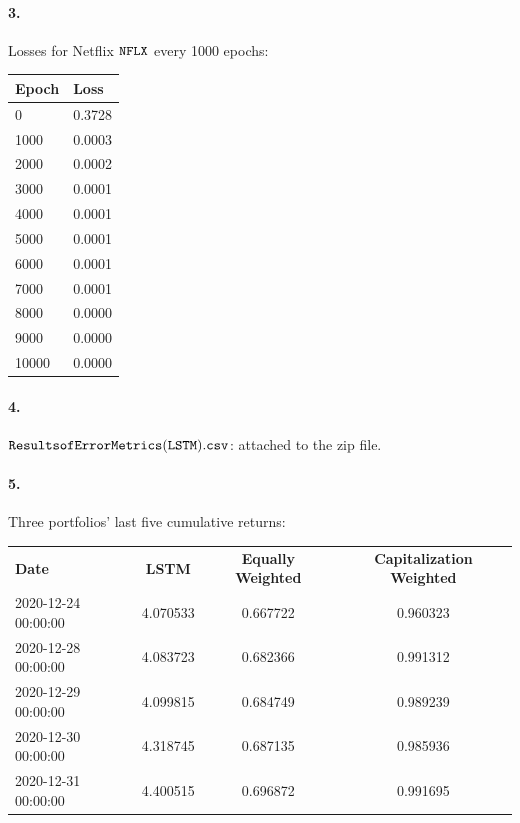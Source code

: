 \documentclass[12pt]{article}
\begin{document}
\paragraph{3.} Losses for Netflix $\tt NFLX$ every 1000 epochs:

\begin{center}
    \begin{tabular}{l l}
    \rowcolor{gray!50}
        \bf{Epoch} & \bf{Loss} \\
        \hline
    0 & 0.3728 \\
    1000 &0.0003 \\
    2000 &0.0002 \\
    3000 &0.0001 \\
    4000 &0.0001 \\
    5000 &0.0001 \\
    6000 &0.0001 \\
    7000 &0.0001 \\
    8000 &0.0000 \\
    9000 &0.0000 \\
    10000 &0.0000 \\
    \end{tabular}
\end{center}

\paragraph{4.} $ \tt Results of Error Metrics (LSTM).csv$: attached to the zip file.

\paragraph{5.} Three portfolios’ last five cumulative returns:

\begin{center}
    \begin{tabular}{l c c c}
    \rowcolor{gray!70}
    \multicolumn{4}{c}{\textbf{Cumulative Returns of Portfolios}}\\
    \hline
    \rowcolor{gray!50}
        \bf{Date} & \bf{LSTM} & \bf{Equally Weighted}& \bf{Capitalization Weighted}\\
        \hline
        2020-12-24 00:00:00	&4.070533 &0.667722 &0.960323\\
        2020-12-28 00:00:00	&4.083723 &0.682366 &0.991312\\
        2020-12-29 00:00:00	&4.099815 &0.684749 &0.989239\\
        2020-12-30 00:00:00	&4.318745 &0.687135 &0.985936\\
        2020-12-31 00:00:00	&4.400515 &0.696872 &0.991695\\
    \end{tabular}
\end{center}
\end{document}
